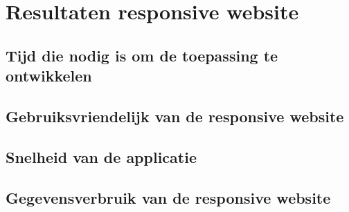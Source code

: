 \chapter{Resultaten responsive website}
\label{ch:resultatenresponsivewebsite}
\section{Tijd die nodig is om de toepassing te ontwikkelen}

\section{Gebruiksvriendelijk van de responsive website}

\section{Snelheid van de applicatie}

\section{Gegevensverbruik van de responsive website}
